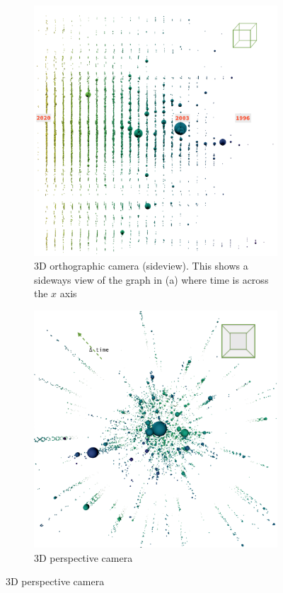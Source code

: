\begin{figure}[]
\begin{subfigure}{0.47\textwidth}
         \includegraphics[width=\textwidth]{figures_c3/sideall.png}
         \caption{3D orthographic camera (sideview). This shows a sideways view of the graph in (a) where time is across the $x$ axis }
         \label{fig:sideweb}
     \end{subfigure}
     \hfill

     \begin{subfigure}[b]{0.75\textwidth}
         \centering
         \includegraphics[width=\textwidth]{figures_c3/threeall.png}
         \caption{3D perspective camera}
         \label{fig:3dgeph}
     \end{subfigure}



\end{figure}
